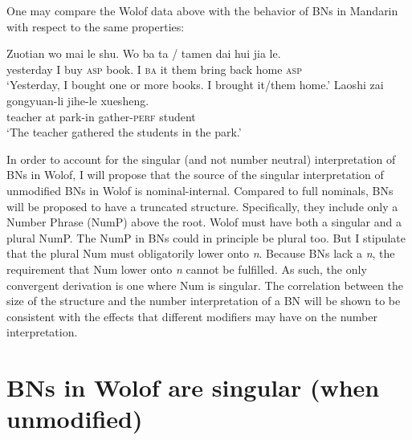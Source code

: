 \documentclass[output=paper]{langscibook}
\begin{document}
		\label{fon:bNnGaThHr}
		\z
		
\noindent   One may compare the Wolof data above with the behavior of BNs in Mandarin with respect to the same properties:
			
    \ea \gll Zuotian wo mai le {shu}. Wo ba ta / tamen dai hui jia le.\\
		yesterday I buy \textsc{asp} book. I \textsc{ba} it {} them bring back home \textsc{asp}\\
		\glt    `Yesterday, I bought one or more books. I brought it/them home.'
	\ex \gll	Laoshi zai gongyuan-li jihe-le {xuesheng}.\\
			teacher at park-in gather-\textsc{perf} student\\
			\glt    `The teacher gathered the students in the park.'
	\z
		
In order to account for the singular (and not number neutral) interpretation of BNs in Wolof,  I will propose that the source of the singular interpretation of unmodified BNs in Wolof is nominal-internal. Compared to full nominals, BNs will be proposed to have a truncated structure. Specifically, they include only a Number Phrase (NumP) above the root. Wolof must have both a singular and a plural NumP. The NumP in BNs could in principle be plural too. But I stipulate that the plural Num must obligatorily lower onto \textit{n}. Because BNs lack a \textit{n}, the requirement that Num lower onto \textit{n} cannot be fulfilled. As such, the only convergent derivation is one where Num is singular. The correlation between the size of the structure and the number interpretation of a BN will be shown to be consistent with the effects that different modifiers may have on the number interpretation.

\section{BNs in Wolof are singular (when unmodified)}
\label{fon:sEk:BnNSgG}
\end{document}
